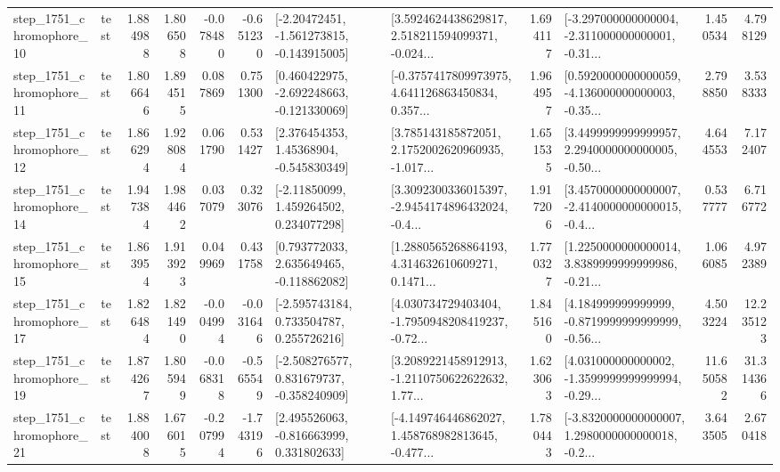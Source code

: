 \begin{tabular}{llrrrrllrlrr}
 step\_1751\_chromophore\_10 &      test &      1.884988 &    1.806508 &     -0.078480 & -0.651230 &   [-2.20472451, -1.561273815, -0.143915005] &  [3.5924624438629817, 2.518211594099371, -0.024... &       1.694117 &  [-3.297000000000004, -2.311000000000001, -0.31... &            1.450534 &          4.798129 \\
 step\_1751\_chromophore\_11 &      test &      1.806646 &    1.894515 &      0.087869 &  0.751300 &   [0.460422975, -2.692248663, -0.121330069] &  [-0.3757417809973975, 4.641126863450834, 0.357... &       1.964957 &  [0.5920000000000059, -4.136000000000003, -0.35... &            2.798850 &          3.538333 \\
 step\_1751\_chromophore\_12 &      test &      1.866294 &    1.928084 &      0.061790 &  0.531427 &     [2.376454353, 1.45368904, -0.545830349] &  [3.785143185872051, 2.1752002620960935, -1.017... &       1.651535 &  [3.4499999999999957, 2.2940000000000005, -0.50... &            4.644553 &          7.172407 \\
 step\_1751\_chromophore\_14 &      test &      1.947384 &    1.984462 &      0.037079 &  0.323076 &     [-2.11850099, 1.459264502, 0.234077298] &  [3.3092300336015397, -2.9454174896432024, -0.4... &       1.917206 &  [3.4570000000000007, -2.4140000000000015, -0.4... &            0.537777 &          6.716772 \\
 step\_1751\_chromophore\_15 &      test &      1.863954 &    1.913923 &      0.049969 &  0.431758 &    [0.793772033, 2.635649465, -0.118862082] &  [1.2880565268864193, 4.314632610609271, 0.1471... &       1.770327 &  [1.2250000000000014, 3.8389999999999986, -0.21... &            1.066085 &          4.972389 \\
 step\_1751\_chromophore\_17 &      test &      1.826484 &    1.821490 &     -0.004994 & -0.031646 &    [-2.595743184, 0.733504787, 0.255726216] &  [4.030734729403404, -1.7950948208419237, -0.72... &       1.845160 &  [4.184999999999999, -0.8719999999999999, -0.56... &            4.503224 &         12.235123 \\
 step\_1751\_chromophore\_19 &      test &      1.874267 &    1.805949 &     -0.068318 & -0.565549 &   [-2.508276577, 0.831679737, -0.358240909] &  [3.2089221458912913, -1.2110750622622632, 1.77... &       1.623063 &  [4.031000000000002, -1.3599999999999994, -0.29... &           11.650582 &         31.314366 \\
 step\_1751\_chromophore\_21 &      test &      1.884008 &    1.676015 &     -0.207994 & -1.743196 &    [2.495526063, -0.816663999, 0.331802633] &  [-4.149746446862027, 1.458768982813645, -0.477... &       1.780443 &  [-3.8320000000000007, 1.2980000000000018, -0.2... &            3.643505 &          2.670418 \\

\end{tabular}

